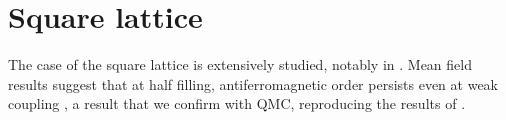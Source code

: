 \section{Square lattice}
\label{sec:square}

The case of the square lattice is extensively studied, notably in \cite{white_numerical_1989}.
Mean field results suggest that at half filling,  antiferromagnetic order persists even at weak coupling \cite{claveau_mean-field_2014}, a result that we confirm with \ac{QMC}, reproducing the results of \cite{white_numerical_1989}.